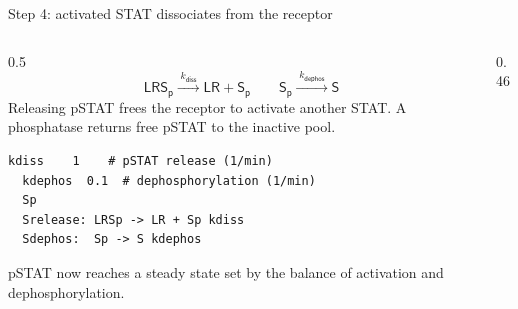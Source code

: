 \documentclass[aspectratio=169,10pt,t]{beamer}
\begin{document}
\begin{frame}[fragile]{Step 4: activated STAT dissociates from the receptor}
  \begin{columns}[T]
    \begin{column}{0.5\textwidth}
      \[
        \mathsf{LRS_p} \xrightarrow{\;k_\mathsf{diss}\;} \mathsf{LR} + \mathsf{S_p}
        \qquad
        \mathsf{S_p} \xrightarrow{\;k_\mathsf{dephos}\;} \mathsf{S}
      \]
      Releasing pSTAT frees the receptor to activate another STAT.
      A phosphatase returns free pSTAT to the inactive pool.
\begin{lstlisting}[language=bngl]
  kdiss    1    # pSTAT release (1/min)
  kdephos  0.1  # dephosphorylation (1/min)
  Sp
  Srelease: LRSp -> LR + Sp kdiss
  Sdephos:  Sp -> S kdephos
\end{lstlisting}
      pSTAT now reaches a steady state set by the balance of activation and
      dephosphorylation.
    \end{column}
    \begin{column}{0.46\textwidth}
      \centering
      \\[1mm]
    \end{column}
  \end{columns}
\end{frame}
\end{document}
